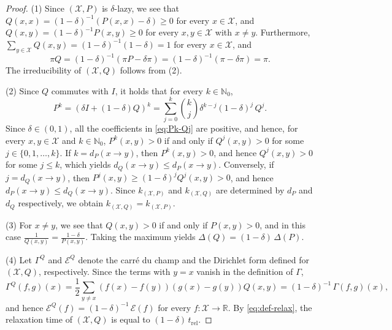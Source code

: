 \documentclass[a4paper, reqno, 11pt]{amsart}
\theoremstyle{definition}
\begin{document}
\begin{proof}
(1)
Since $(\mathcal{X}, P)$ is $\delta$-lazy, we see that
$Q(x,x) = (1-\delta)^{-1}\left(P(x,x) - \delta\right) \ge 0$ for every $x \in \mathcal{X}$,
and $Q(x,y) = (1-\delta)^{-1} P(x,y) \ge 0$ for every $x, y \in \mathcal{X}$ with $x \ne y$.
Furthermore, $\sum_{y \in \mathcal{X}} Q(x,y) = (1-\delta)^{-1}(1 - \delta) = 1$ for every $x \in \mathcal{X}$, and
\[ \pi Q = (1-\delta)^{-1}\left(\pi P - \delta \pi\right) = (1-\delta)^{-1}\left(\pi - \delta \pi\right) = \pi. \]
The irreducibility of $(\mathcal{X}, Q)$ follows from (2).

(2)
Since $Q$ commutes with $I$, it holds that for every $k \in \mathbb{N}_0$,
\begin{equation}\label{eq:Pk-Qj}
P^{k} = \left(\delta I + (1-\delta) Q\right)^{k} = \sum_{j=0}^{k} \binom{k}{j} \delta^{k-j} (1-\delta)^{j}\, Q^{j}.
\end{equation}
Since $\delta \in \left(0,1\right)$, all the coefficients in \eqref{eq:Pk-Qj} are positive, and hence,
for every $x, y \in \mathcal{X}$ and $k \in \mathbb{N}_0$,
$P^{k}(x,y) > 0$ if and only if $Q^{j}(x,y) > 0$ for some $j \in \{0, 1, \dots, k\}$.
If $k = d_{P}(x \to y)$, then $P^{k}(x,y) > 0$, and hence $Q^{j}(x,y) > 0$ for some $j \le k$, which yields $d_{Q}(x \to y) \le d_{P}(x \to y)$.
Conversely, if $j = d_{Q}(x \to y)$, then $P^{j}(x,y) \ge (1-\delta)^{j} Q^{j}(x,y) > 0$, and hence $d_{P}(x \to y) \le d_{Q}(x \to y)$.
Since $k_{(\mathcal{X}, P)}$ and $k_{(\mathcal{X}, Q)}$ are determined by $d_{P}$ and $d_{Q}$ respectively, we obtain $k_{(\mathcal{X}, Q)} = k_{(\mathcal{X}, P)}$.

(3)
For $x \ne y$, we see that $Q(x,y) > 0$ if and only if $P(x,y) > 0$, and in this case $\frac{1}{Q(x,y)} = \frac{1-\delta}{P(x,y)}$.
Taking the maximum yields $\Delta(Q) = (1-\delta)\,\Delta(P)$.

(4)
Let $\Gamma^{Q}$ and $\mathcal{E}^{Q}$ denote the carr\'e du champ and the Dirichlet form defined for $(\mathcal{X}, Q)$, respectively.
Since the terms with $y = x$ vanish in the definition of $\Gamma$,
\begin{equation}\label{eq:Gamma-Q}
\Gamma^{Q}(f,g)(x) = \frac{1}{2} \sum_{y \ne x} \left(f(x)-f(y)\right)\left(g(x)-g(y)\right) Q(x,y) = (1-\delta)^{-1}\,\Gamma(f,g)(x),
\end{equation}
and hence $\mathcal{E}^{Q}(f) = (1-\delta)^{-1}\,\mathcal{E}(f)$ for every $f \colon \mathcal{X} \to \mathbb{R}$.
By \eqref{eq:def-relax}, the relaxation time of $(\mathcal{X}, Q)$ is equal to $(1-\delta)\,t_{\mathrm{rel}}$.


\end{proof}
\end{document}
